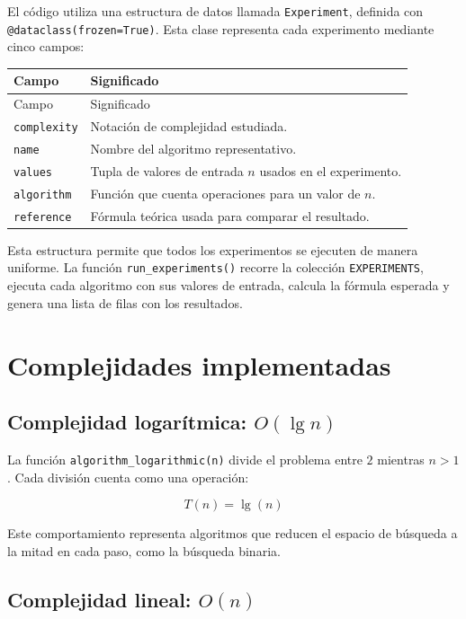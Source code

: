 \documentclass[12pt,letterpaper]{article}
\begin{document}
El código utiliza una estructura de datos llamada \texttt{Experiment}, definida con \texttt{@dataclass(frozen=True)}. Esta clase representa cada experimento mediante cinco campos:

\begin{longtable}{p{} p{}}
\toprule
Campo & Significado \\
\midrule
\endfirsthead
\toprule
Campo & Significado \\
\midrule
\endhead
\texttt{complexity} & Notación de complejidad estudiada. \\
\texttt{name} & Nombre del algoritmo representativo. \\
\texttt{values} & Tupla de valores de entrada $n$ usados en el experimento. \\
\texttt{algorithm} & Función que cuenta operaciones para un valor de $n$. \\
\texttt{reference} & Fórmula teórica usada para comparar el resultado. \\
\bottomrule
\end{longtable}

Esta estructura permite que todos los experimentos se ejecuten de manera uniforme. La función \texttt{run\_experiments()} recorre la colección \texttt{EXPERIMENTS}, ejecuta cada algoritmo con sus valores de entrada, calcula la fórmula esperada y genera una lista de filas con los resultados.

\section{Complejidades implementadas}

\subsection{Complejidad logarítmica: \texorpdfstring{$O(\lg n)$}{O(lg n)}}

La función \texttt{algorithm\_logarithmic(n)} divide el problema entre $2$ mientras $n > 1$. Cada división cuenta como una operación:

\[
T(n) = \lg(n)
\]

Este comportamiento representa algoritmos que reducen el espacio de búsqueda a la mitad en cada paso, como la búsqueda binaria.

\subsection{Complejidad lineal: \texorpdfstring{$O(n)$}{O(n)}}
\end{document}
